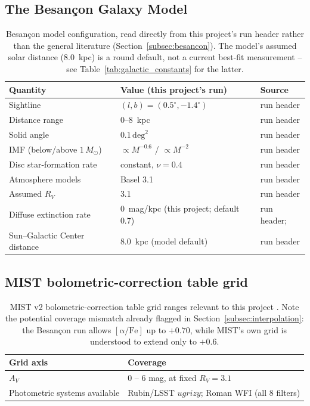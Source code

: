 \documentclass[english,10pt,a4paper]{article}
\begin{document}
	\subsection{The Besan\c{c}on Galaxy Model}
	
	\begin{table}[htbp]
		\centering
		\begin{tabular}{lll}
			\toprule
			Quantity & Value (this project's run) & Source \\
			\midrule
			Sightline & $(l,b)=(0.5^{\circ},-1.4^{\circ})$ & run header \\
			Distance range & 0--8~kpc & run header \\
			Solid angle & $0.1\,\mathrm{deg}^2$ & run header \\
			IMF (below/above $1\,M_\odot$) & $\propto M^{-0.6}$ / $\propto M^{-2}$ & run header \\
			Disc star-formation rate & constant, $\nu=0.4$ & run header \\
			Atmosphere models & Basel 3.1 & run header \\
			Assumed $R_V$ & 3.1 & run header \\
			Diffuse extinction rate & 0~mag/kpc (this project; default 0.7) & run header; \cite{Robin2003Besancon} \\
			Sun--Galactic Center distance & 8.0~kpc (model default) & run header \\
			\bottomrule
		\end{tabular}
		\caption{Besan\c{c}on model configuration, read directly from this project's run header rather than the general literature (Section~\ref{subsec:besancon}). The model's assumed solar distance (8.0~kpc) is a round default, not a current best-fit measurement -- see Table~\ref{tab:galactic_constants} for the latter.}
		\label{tab:besancon_config}
	\end{table}
	
	\subsection{MIST bolometric-correction table grid}
	
	\begin{table}[htbp]
		\centering
		\begin{tabular}{ll}
			\toprule
			Grid axis & Coverage \\
			\midrule
			$A_V$ & 0 -- 6 mag, at fixed $R_V=3.1$ \\
			Photometric systems available & Rubin/LSST $ugrizy$; Roman WFI (all 8 filters) \\
			\bottomrule
		\end{tabular}
		\caption{MIST v2 bolometric-correction table grid ranges relevant to this project \cite{Choi2016MIST}. Note the potential coverage mismatch already flagged in Section~\ref{subsec:interpolation}: the Besan\c{c}on run allows $\mathrm{[\alpha/Fe]}$ up to $+0.70$, while MIST's own grid is understood to extend only to $+0.6$.}
		\label{tab:mist_grid}
	\end{table}
	
\end{document}

